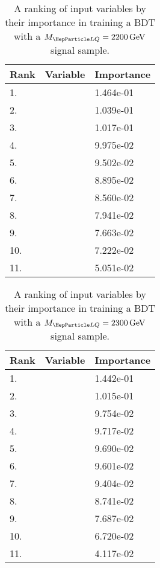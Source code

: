 \begin{table}[H]
	\caption{A ranking of input variables by their importance in training a BDT with a $\MLQ = \SI{2200}{GeV}$ signal sample.}
	\begin{center}
		\begin{tabular}{lll} \hline \hline
			Rank & Variable & Importance  \\ \hline
			1. & \MujTwo & 1.464e-01 \\
			2. & \MujOne & 1.039e-01 \\
			3. & \Muujj & 1.017e-01 \\
			4. & \ST & 9.975e-02 \\
			5. & \ptof{\PjTwo} & 9.502e-02 \\
			6. & \Muu & 8.895e-02 \\
			7. & \ptof{\PmuTwo} & 8.560e-02 \\
			8. & \ptof{\PjOne} & 7.941e-02 \\
			9. & \ptof{\PmuOne} & 7.663e-02 \\
			10. & \DRof{\PmuOne+\PmuTwo}{\PjOne} & 7.222e-02 \\
			11. & \MET & 5.051e-02 \\ \hline \hline
		\end{tabular}
		\label{tab:bdtRank2200}
	\end{center}
\end{table}

\begin{table}[H]
	\caption{A ranking of input variables by their importance in training a BDT with a $\MLQ = \SI{2300}{GeV}$ signal sample.}
	\begin{center}
		\begin{tabular}{lll} \hline \hline
			Rank & Variable & Importance  \\ \hline
			1. & \MujTwo & 1.442e-01 \\
			2. & \Muu & 1.015e-01 \\
			3. & \Muujj & 9.754e-02 \\
			4. & \ptof{\PjTwo} & 9.717e-02 \\
			5. & \MujOne & 9.690e-02 \\
			6. & \ST & 9.601e-02 \\
			7. & \ptof{\PmuTwo} & 9.404e-02 \\
			8. & \DRof{\PmuOne+\PmuTwo}{\PjOne} & 8.741e-02 \\
			9. & \ptof{\PjOne} & 7.687e-02 \\
			10. & \ptof{\PmuOne} & 6.720e-02 \\
			11. & \MET & 4.117e-02 \\ \hline \hline
		\end{tabular}
		\label{tab:bdtRank2300}
	\end{center}
\end{table}

